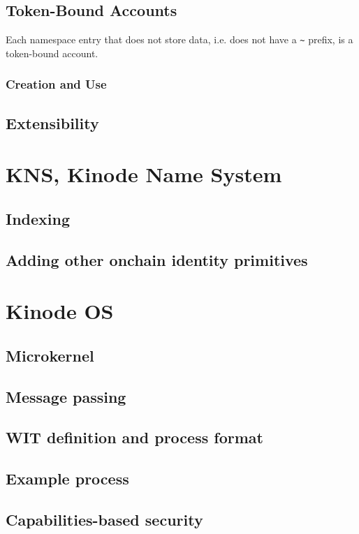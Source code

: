 \documentclass[runningheads]{llncs}
\begin{document}
\subsection{Token-Bound Accounts}

Each namespace entry that does not store data, i.e. does not have a \verb|~| prefix, is a token-bound account.


\subsubsection{Creation and Use}
\subsection{Extensibility}



\section{KNS, Kinode Name System}
\subsection{Indexing}
\subsection{Adding other onchain identity primitives}



\section{Kinode OS}
\subsection{Microkernel}
\subsection{Message passing}
\subsection{WIT definition and process format}
\subsection{Example process}
\subsection{Capabilities-based security}
\end{document}
